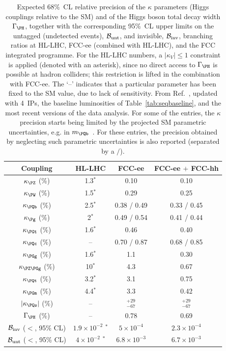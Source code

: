 \begin{table}[ht]
\centering
\caption{Expected 68\%~CL relative precision of the $\kappa$ parameters (Higgs couplings relative to the SM) 
and of the Higgs boson total decay width $\Gamma_{\PH}$, 
together with the corresponding 95\%~CL upper limits on the untagged (undetected events), $\cal{B}_{\text{unt}}$, 
and invisible, $\cal{B}_{\text{inv}}$, branching ratios at HL-LHC, FCC-ee (combined with HL-LHC), and the FCC integrated programme.
For the HL-LHC numbers, a $|\kappa_V| \leq 1$ constraint is applied (denoted with an asterisk), 
since no direct access to $\Gamma_{\PH}$
is possible at hadron colliders;
this restriction is lifted in the combination with FCC-ee.
The `--' indicates that a particular parameter has been fixed to the SM value, due to lack of sensitivity.
From Ref.~\cite{deBlas:2019rxi}, updated with 4~IPs, the baseline luminosities of Table~\ref{tab:seqbaseline}, and the most recent versions of the data analysis. 
For some of the entries, the $\kappa$ precision starts being limited by the projected SM parametric uncertainties, e.g. in $m_{\PQb}$~\cite{Freitas:2019bre}. For these entries, the precision obtained by neglecting such parametric uncertainties is also reported (separated by a $/$).
}
\label{tab:HiggsKappa3}
\begin{tabular}{ c   c    c     c }%
\toprule
Coupling & HL-LHC 
& FCC-ee 
& FCC-ee $+$ FCC-hh\\ 
\midrule 
$\kappa_{\PZ}$ (\%) &  1.3$^\ast$ 
& 0.10  
& 0.10 \\ 
$\kappa_{\PW}$ (\%)  &   1.5$^\ast$  
& 0.29 
& 0.25 \\
$\kappa_{\PQb}$ (\%)  & 2.5$^\ast$  
& 0.38 / 0.49 
& 0.33 / 0.45 \\ 
$\kappa_{\Pg}$ (\%)    &   2$^\ast$ 
& 0.49 / 0.54 
& 0.41 / 0.44 \\
$\kappa_{\PGt}$ (\%)   & 1.6$^\ast$   
& 0.46 
& 0.40 \\
$\kappa_{\PQc}$ (\%)   & --  
&0.70 / 0.87 
& 0.68 / 0.85 \\
$\kappa_{\PGg}$ (\%)  &  1.6$^\ast$  
& 1.1 
& 0.30 \\
$\kappa_{\PZ\PGg}$ (\%)    & 10$^\ast$  
& 4.3
& 0.67\\
$\kappa_{\PQt}$ (\%)   & 3.2$^\ast$ %
& 3.1 
& 0.75 \\
$\kappa_{\PGm}$ (\%)     & 4.4$^\ast$  
& 3.3 
& 0.42 \\
$\vert \kappa_{\PQs}\vert$ (\%) & -- & $_{-67}^{+29}$ & $_{-67}^{+29}$\\
$\Gamma_{\PH}$ (\%) & -- 
& 0.78
& 0.69 \\ 
$\cal{B}_{\text{inv}}$ ($<$, 95\% CL) 
& $1.9 \times 10^{-2}$ $^\ast$   
& $5 \times 10^{-4}$ 
& $2.3 \times 10^{-4}$ \\
$\cal{B}_{\text{unt}}$ ($<$, 95\% CL) & $4 \times 10^{-2}$ $^\ast$ 
& $6.8\times 10^{-3}$ 
& $6.7\times 10^{-3}$\\
\bottomrule
\end{tabular}
\end{table}



